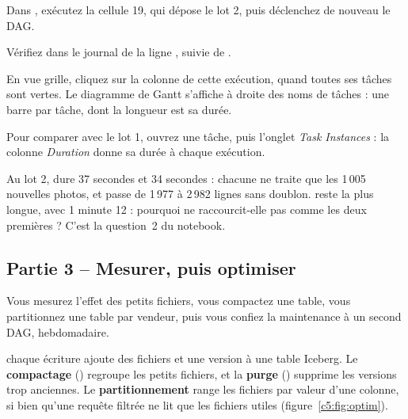 \begin{obtenir}
  \item Dans , exécutez la cellule 19, qui dépose le lot 2, puis déclenchez de nouveau le DAG.
  \item Vérifiez dans le journal de  la ligne , suivie de .
  \item En vue grille, cliquez sur la colonne de cette exécution, quand toutes ses tâches sont vertes. Le diagramme de Gantt s'affiche à droite des noms de tâches : une barre par tâche, dont la longueur est sa durée.
  \item Pour comparer avec le lot 1, ouvrez une tâche, puis l'onglet \emph{Task Instances} : la colonne \emph{Duration} donne sa durée à chaque exécution.
\end{obtenir}
\begin{lecture}
Au lot 2,  dure 37 secondes et  34 secondes : chacune ne
traite que les 1\,005 nouvelles photos, et  passe de 1\,977 à 2\,982 lignes sans
doublon.  reste la plus longue, avec 1 minute 12 : pourquoi ne raccourcit-elle pas
comme les deux premières ? C'est la question~2 du notebook.
\end{lecture}


\subsection*{Partie 3 -- Mesurer, puis optimiser \hfill {}}

Vous mesurez l'effet des petits fichiers, vous compactez une table, vous partitionnez une table par
vendeur, puis vous confiez la maintenance à un second DAG, hebdomadaire.

\begin{notion}
chaque écriture ajoute des fichiers et une version à une table
Iceberg. Le \textbf{compactage} () regroupe les petits fichiers, et la
\textbf{purge} () supprime les versions trop anciennes. Le
\textbf{partitionnement} range les fichiers par valeur d'une colonne, si bien qu'une requête filtrée ne lit
que les fichiers utiles (figure~\ref{c5:fig:optim}).
\end{notion}

